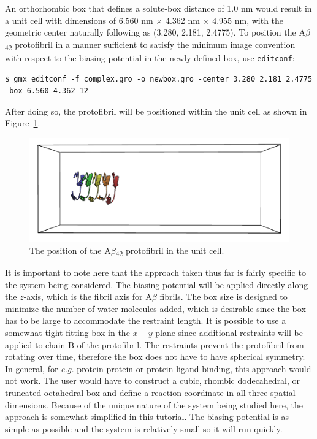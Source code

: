 \documentclass[9pt,tutorial,pubversion]{livecoms}
\begin{document}
An orthorhombic box that defines a solute-box distance of 1.0 nm would result in a unit cell with dimensions of 6.560 nm $\times$ 4.362 nm $\times$ 4.955 nm, with the geometric center naturally following as (3.280, 2.181, 2.4775). To position the A$\beta$\textsubscript{42} protofibril in a manner sufficient to satisfy the minimum image convention with respect to the biasing potential in the newly defined box, use \texttt{editconf}:

\begin{lstlisting}
$ gmx editconf -f complex.gro -o newbox.gro -center 3.280 2.181 2.4775 -box 6.560 4.362 12
\end{lstlisting}
%
After doing so, the protofibril will be positioned within the unit cell as shown in Figure~\ref{umbrella_box_fig}.

\begin{figure}[H]
\centering
\includegraphics{umbrella_protofibril_box}
\caption{The position of the A$\beta$\textsubscript{42} protofibril in the unit cell.}
\label{umbrella_box_fig}
\end{figure}

It is important to note here that the approach taken thus far is fairly specific to the system being considered. The biasing potential will be applied directly along the $z$-axis, which is the fibril axis for A$\beta$ fibrils. The box size is designed to minimize the number of water molecules added, which is desirable since the box has to be large to accommodate the restraint length. It is possible to use a somewhat tight-fitting box in the $x-y$ plane since additional restraints will be applied to chain B of the protofibril. The restraints prevent the protofibril from rotating over time, therefore the box does not have to have spherical symmetry. In general, for {\em e.g.} protein-protein or protein-ligand binding, this approach would not work. The user would have to construct a cubic, rhombic dodecahedral, or truncated octahedral box and define a reaction coordinate in all three spatial dimensions. Because of the unique nature of the system being studied here, the approach is somewhat simplified in this tutorial. The biasing potential is as simple as possible and the system is relatively small so it will run quickly.
\end{document}
